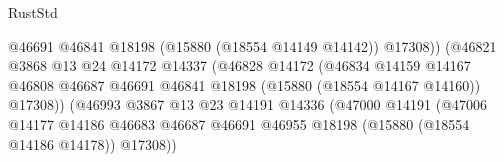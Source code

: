 \begin{lexlean}{RustStd}
\begin{coremodule}
                                                      @46691
                                                      @46841
                                                      @18198
                                                      (@15880 (@18554 @14149 @14142))
                                                      @17308))
                                                  (@46821
                                                    @3868
                                                    @13
                                                    @24
                                                    @14172
                                                    @14337
                                                    (@46828
                                                      @14172
                                                      (@46834
                                                        @14159
                                                        @14167
                                                        @46808
                                                        @46687
                                                        @46691
                                                        @46841
                                                        @18198
                                                        (@15880 (@18554 @14167 @14160))
                                                        @17308))
                                                    (@46993
                                                      @3867
                                                      @13
                                                      @23
                                                      @14191
                                                      @14336
                                                      (@47000
                                                        @14191
                                                        (@47006
                                                          @14177
                                                          @14186
                                                          @46683
                                                          @46687
                                                          @46691
                                                          @46955
                                                          @18198
                                                          (@15880 (@18554 @14186 @14178))
                                                          @17308))

\end{coremodule}
\end{lexlean}
